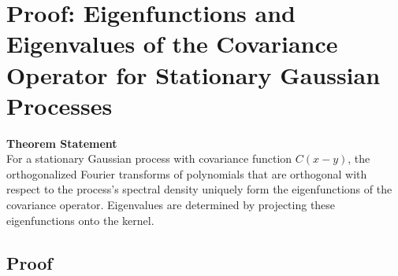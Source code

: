 \documentclass{article}
\begin{document}
\section*{Proof: Eigenfunctions and Eigenvalues of the Covariance Operator for Stationary Gaussian Processes}

\textbf{Theorem Statement}\\
For a stationary Gaussian process with covariance function $C(x-y)$, the orthogonalized Fourier transforms of polynomials that are orthogonal with respect to the process's spectral density uniquely form the eigenfunctions of the covariance operator. Eigenvalues are determined by projecting these eigenfunctions onto the kernel.

\subsection*{Proof}
\end{document}

